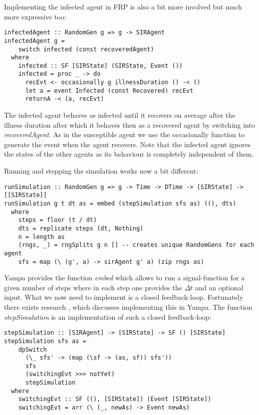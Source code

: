 Implementing the infected agent in FRP is also a bit more involved but much more expressive too:

\begin{verbatim}
infectedAgent :: RandomGen g => g -> SIRAgent
infectedAgent g = 
    switch infected (const recoveredAgent)
  where
    infected :: SF [SIRState] (SIRState, Event ())
    infected = proc _ -> do
      recEvt <- occasionally g illnessDuration () -< ()
      let a = event Infected (const Recovered) recEvt
      returnA -< (a, recEvt)
\end{verbatim}

The infected agent behaves as infected until it recovers on average after the illness duration after which it behaves then as a recovered agent by switching into \textit{recoveredAgent}. As in the susceptible agent we use the occasionally function to generate the event when the agent recovers. Note that the infected agent ignores the states of the other agents as its behaviour is completely independent of them.

Running and stepping the simulation works now a bit different:

\begin{verbatim}
runSimulation :: RandomGen g => g -> Time -> DTime -> [SIRState] -> [[SIRState]]
runSimulation g t dt as = embed (stepSimulation sfs as) ((), dts)
  where
    steps = floor (t / dt)
    dts = replicate steps (dt, Nothing)
    n = length as
    (rngs, _) = rngSplits g n [] -- creates unique RandomGens for each agent
    sfs = map (\ (g', a) -> sirAgent g' a) (zip rngs as)
\end{verbatim}

Yampa provides the function \textit{embed} which allows to run a signal-function for a given number of steps where in each step one provides the $\Delta t$ and an optional input. What we now need to implement is a closed feedback-loop. Fortunately there exists research \cite{nilsson_functional_2002}, \cite{courtney_yampa_2003} which discusses implementing this in Yampa. The function \textit{stepSimulation} is an implementation of such a closed feedback-loop:

\begin{verbatim}
stepSimulation :: [SIRAgent] -> [SIRState] -> SF () [SIRState]
stepSimulation sfs as =
    dpSwitch
      (\_ sfs' -> (map (\sf -> (as, sf)) sfs'))
      sfs
      (switchingEvt >>> notYet) 
      stepSimulation
  where
    switchingEvt :: SF ((), [SIRState]) (Event [SIRState])
    switchingEvt = arr (\ (_, newAs) -> Event newAs)
\end{verbatim}

